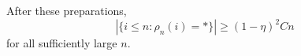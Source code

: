\documentclass[11pt,a4paper]{article}
\begin{document}
After these preparations, 
\begin{equation}
|\{i \leq n: \rho_n(i) = *\}| \geq (1-\eta)^2 C n
\end{equation}
for all sufficiently large $n$.







\end{document}
